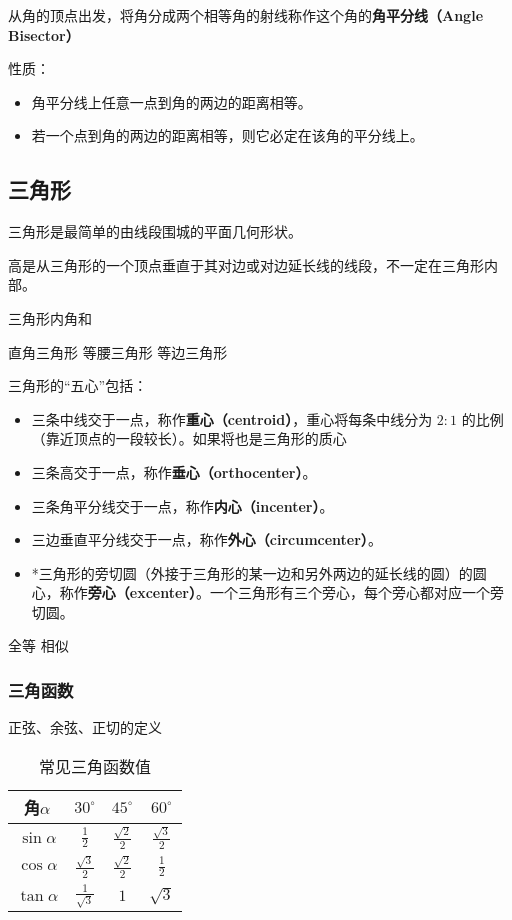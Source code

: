 从角的顶点出发，将角分成两个相等角的射线称作这个角的\textbf{角平分线（Angle Bisector）}

性质：
\begin{itemize}
    \item 角平分线上任意一点到角的两边的距离相等。
    \item 若一个点到角的两边的距离相等，则它必定在该角的平分线上。
\end{itemize}


\subsection{三角形}

三角形是最简单的由线段围城的平面几何形状。

高是从三角形的一个顶点垂直于其对边或对边延长线的线段，不一定在三角形内部。

三角形内角和

直角三角形
等腰三角形
等边三角形


三角形的“五心”包括：
\begin{itemize}
\item 三条中线交于一点，称作\textbf{重心（centroid）}，重心将每条中线分为 $2:1$ 的比例（靠近顶点的一段较长）。如果将也是三角形的质心
\item 三条高交于一点，称作\textbf{垂心（orthocenter）}。
\item 三条角平分线交于一点，称作\textbf{内心（incenter）}。
\item 三边垂直平分线交于一点，称作\textbf{外心（circumcenter）}。
\item *三角形的旁切圆（外接于三角形的某一边和另外两边的延长线的圆）的圆心，称作\textbf{旁心（excenter）}。一个三角形有三个旁心，每个旁心都对应一个旁切圆。
\end{itemize}

全等
相似

\subsubsection{三角函数}

正弦、余弦、正切的定义

\begin{table}[ht]
\centering
\caption{常见三角函数值}\label{tab_HsGeBa1}
\begin{tabular}{|c|c|c|c|}
\hline
角$\alpha$ & $30^{\circ}$ & $45^{\circ}$ & $60^{\circ}$ \\
\hline
$\sin\alpha$ & $\displaystyle\frac{1}{2}$ & $\displaystyle\frac{\sqrt{2}}{2}$ & $\displaystyle\frac{\sqrt{3}}{2}$ \\
\hline
$\cos\alpha$ & $\displaystyle\frac{\sqrt{3}}{2}$& $\displaystyle\frac{\sqrt{2}}{2}$ &  $\displaystyle\frac{1}{2}$ \\
\hline
$\tan\alpha$ & $\displaystyle\frac{1}{\sqrt{3}}$ & $1$ & $\sqrt{3}$ \\
\hline
\end{tabular}
\end{table}
